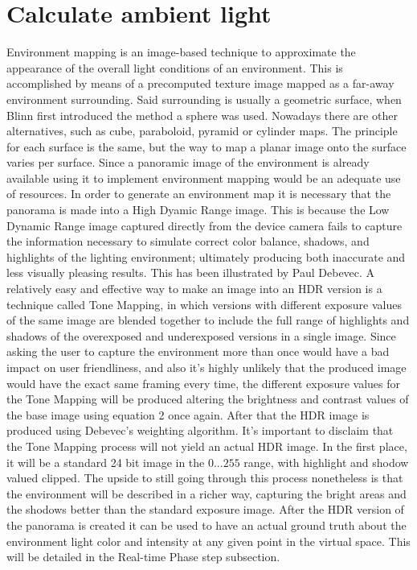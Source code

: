 \section{Calculate ambient light}
Environment mapping is an image-based technique to approximate the appearance of the overall light conditions of an environment. This is accomplished by means of a precomputed texture image mapped as a far-away environment surrounding. Said surrounding is usually a geometric surface, when Blinn first introduced the method\cite{Blinn76} a sphere was used. Nowadays there are other alternatives, such as cube, paraboloid, pyramid or cylinder maps. The principle for each surface is the same, but the way to map a planar image onto the surface varies per surface.\newline
Since a panoramic image of the environment is already available using it to implement environment mapping would be an adequate use of resources. In order to generate an environment map it is necessary that the panorama is made into a High Dyamic Range image. This is because the Low Dynamic Range image captured directly from the device camera fails to capture the information necessary to simulate correct color balance, shadows, and highlights of the lighting environment; ultimately producing both inaccurate and less visually pleasing results. This has been illustrated by Paul Debevec.\cite{DebevecRSO}\newline 
A relatively easy and effective way to make an image into an HDR version is a technique called Tone Mapping, in which versions with different exposure values of the same image are blended together to include the full range of highlights and shadows of the overexposed and underexposed versions in a single image. Since asking the user to capture the environment more than once would have a bad impact on user friendliness, and also it's highly unlikely that the produced image would have the exact same framing every time, the different exposure values for the Tone Mapping will be produced altering the brightness and contrast values of the base image using equation 2 once again. After that the HDR image is produced using Debevec's weighting algorithm\cite{Debevec}.\newline
It's important to disclaim that the Tone Mapping process will not yield an actual HDR image. In the first place, it will be a standard 24 bit image in the $0...255$ range, with highlight and shodow valued clipped. The upside to still going through this process nonetheless is that the environment will be described in a richer way, capturing the bright areas and the shodows better than the standard exposure image.\newline
After the HDR version of the panorama is created it can be used to have an actual ground truth about the environment light color and intensity at any given point in the virtual space. This will be detailed in the Real-time Phase step subsection.

